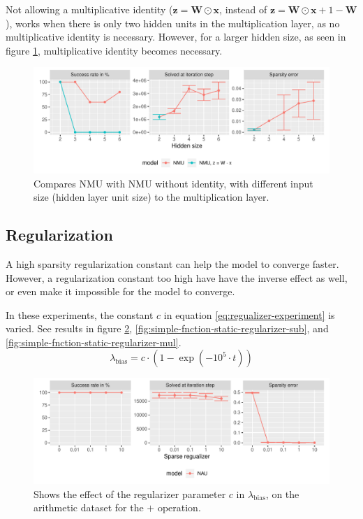 Not allowing a multiplicative identity ($\mathbf{z} = \mathbf{W} \odot \mathbf{x}$, instead of $\mathbf{z} = \mathbf{W} \odot \mathbf{x} + 1 - \mathbf{W}$), works when there is only two hidden units in the multiplication layer, as no multiplicative identity is necessary. However, for a larger hidden size, as seen in figure \ref{fig:simple-function-static-ablation-hidden-size}, multiplicative identity becomes necessary.
\begin{figure}[h]
\centering
\includegraphics[width=\linewidth]{results/simple_function_static_ablation_hidden_size.pdf}
\caption{Compares NMU with NMU without identity, with different input size (hidden layer unit size) to the multiplication layer.}
\label{fig:simple-function-static-ablation-hidden-size}
\end{figure}

\subsection{Regularization}
\label{sec:appendix:simple-function-task:regualization}
A high sparsity regularization constant can help the model to converge faster. However, a regularization constant too high have have the inverse effect as well, or even make it impossible for the model to converge.

In these experiments, the constant $c$ in equation \ref{eq:regualizer-experiment} is varied. See results in figure \ref{fig:simple-fnction-static-regularizer-add}, \ref{fig:simple-fnction-static-regularizer-sub}, and \ref{fig:simple-fnction-static-regularizer-mul}.
\begin{equation}
\lambda_{\mathrm{bias}} = c \cdot (1 - \exp(-10^5 \cdot t))
\label{eq:regualizer-experiment}
\end{equation}

\begin{figure}[h]
\centering
\includegraphics[width=\linewidth]{results/simple_function_static_regualization_add.pdf}
\caption{Shows the effect of the regularizer parameter $c$ in $\lambda_{\mathrm{bias}}$, on the  arithmetic dataset for the $\bm{+}$ operation.}
\label{fig:simple-fnction-static-regularizer-add}
\end{figure}


